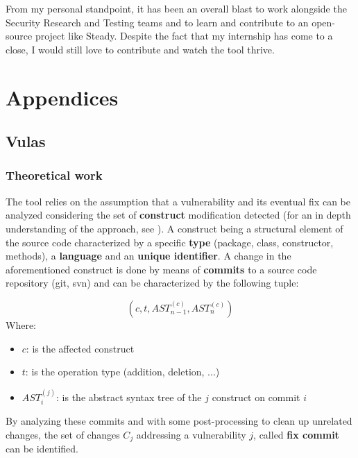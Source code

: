 \documentclass[11pt]{article}
\begin{document}
From my personal standpoint, it has been an overall blast to work alongside the Security Research and Testing teams and to learn and contribute to an open-source project like Steady. Despite the fact that my internship has come to a close, I would still love to contribute and watch the tool thrive.

%
%

\newpage
\section{Appendices}

\subsection{Vulas}
\subsubsection{Theoretical work} \label{sec:vulas_theoretical}
\hspace{5mm}The tool relies on the assumption that a vulnerability and its eventual fix can be analyzed considering the set of \textbf{construct} modification detected (for an in depth understanding of the approach, see \cite{ponta2018icsme}). A construct being a structural element of the source code characterized by a specific \textbf{type} (package, class, constructor, methods), a \textbf{language} and an \textbf{unique identifier}. A change in the aforementioned construct is done by means of \textbf{commits} to a source code repository (git, svn) and can be characterized by the following tuple:

\begin{equation}
\left(c, t, AST_{n - 1}^{(c)}, AST_{n}^{(c)}\right)
\end{equation}
Where:
\begin{itemize}
\vspace{-0.2cm}\item[] $c$: is the affected construct
\vspace{-0.2cm}\item[] $t$: is the operation type (addition, deletion, ...)
\vspace{-0.2cm}\item[] $AST_{i}^{(j)}$: is the abstract syntax tree of the $j$ construct on commit $i$
\end{itemize}

By analyzing these commits and with some post-processing to clean up unrelated changes, the set of changes $C_j$ addressing a vulnerability $j$, called \textbf{fix commit} can be identified. 
\end{document}
